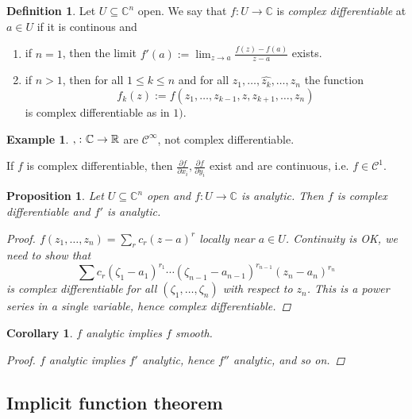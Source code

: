 \documentclass[11pt,A4]{article}
\theoremstyle{plain}
\newtheorem{prop}[thm]{Proposition}
\newtheorem{cor}[thm]{Corollary}
\theoremstyle{definition}
\newtheorem{defn}[thm]{Definition}
\newtheorem{exa}[thm]{Example}
\theoremstyle{remark}
\newcommand{\R}{\mathbb{R}}
\newcommand{\1}{\mathbbm{1}}
\newcommand{\C}{\mathbb{C}}
\newcommand{\calC}{\mathcal{C}}
\let\Re\relax
\DeclareMathOperator{\Re}{Re}
\let\Im\relax
\DeclareMathOperator{\Im}{Im}
\begin{document}
\begin{defn}
    Let $U\subseteq \C^{n}$ open.
    We say that $f\colon U\to \C$ is \textit{complex differentiable} at $a\in U$ if it is continous and
    \begin{enumerate}[label=\roman*)]
	\item if $n=1$, then the limit $f'(a):=\lim_{z\to a}\frac{f(z)-f(a)}{z-a}$ exists.
	\item if $n>1$, then for all $1\leqslant k\leqslant n$ and for all $z_{1},\ldots,\hat{z_{k}},\ldots,z_{n}$ the function
	    \[ f_{k}(z):=f(z_{1},\ldots,z_{k-1},z,z_{k+1},\ldots,z_{n})\]
	    is complex differentiable as in $1)$.
    \end{enumerate}
\end{defn}

\begin{exa}
    $\Re,\Im\colon \C\to \R$ are $\calC^{\infty}$, not complex differentiable.
\end{exa}

If $f$ is complex differentiable, then $\frac{\partial f}{\partial x_{i}},\frac{\partial f}{\partial y_{i}}$ exist and are continuous, i.e. $f\in \calC^{1}$.

\begin{prop}
    Let $U\subseteq \C^{n}$ open and $f\colon U\to \C$ is analytic.
    Then $f$ is complex differentiable and $f'$ is analytic.
    \begin{proof}
	$f(z_{1},\ldots,z_{n})=\sum_{r}c_{r}(z-a)^{r}$ locally near $a\in U$.
	Continuity is OK, we need to show that
	\[ \sum c_{r}(\zeta_{1}-a_{1})^{r_{1}}\cdots (\zeta_{n-1}-a_{n-1})^{r_{n-1}}(z_{n}-a_{n})^{r_{n}}\]
	is complex differentiable for all $(\zeta_{1},\ldots,\zeta_{n})$ with respect to $z_{n}$.
	This is a power series in a single variable, hence complex differentiable.
    \end{proof}
\end{prop}

\begin{cor}
    $f$ analytic implies $f$ smooth.
    \begin{proof}
	$f$ analytic implies $f'$ analytic, hence $f''$ analytic, and so on.
    \end{proof}
\end{cor}

\subsection{Implicit function theorem}
\end{document}
